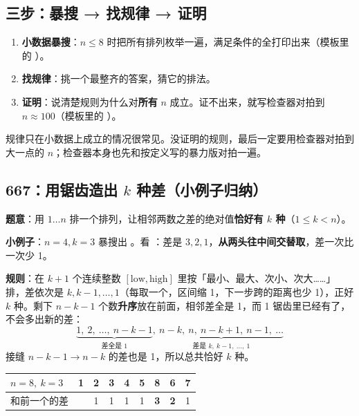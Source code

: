 \subsection{三步：暴搜 → 找规律 → 证明}

\begin{enumerate}
\item \textbf{小数据暴搜}：$n \le 8$ 时把所有排列枚举一遍，满足条件的全打印出来（模板里的 ）。
\item \textbf{找规律}：挑一个最整齐的答案，猜它的排法。
\item \textbf{证明}：说清楚规则为什么对\textbf{所有} $n$ 成立。证不出来，就写检查器对拍到 $n \approx 100$（模板里的 ）。
\end{enumerate}

\begin{principle}
规律只在小数据上成立的情况很常见。没证明的规则，最后一定要用检查器对拍到大一点的 $n$；检查器本身也先和按定义写的暴力版对拍一遍。
\end{principle}

\subsection{\texorpdfstring{667：用锯齿造出 $k$ 种差（小例子归纳）}{667：用锯齿造出 k 种差（小例子归纳）}}

\textbf{题意}：用 $1 \dots n$ 排一个排列，让相邻两数之差的绝对值\textbf{恰好有 $k$ 种}（$1 \le k < n$）。

\textbf{小例子}：$n = 4, k = 3$ 暴搜出 。看 ：差是 $3, 2, 1$，\textbf{从两头往中间交替取}，差一次比一次少 1。

\textbf{规则}：在 $k+1$ 个连续整数 $[\text{low}, \text{high}]$ 里按「最小、最大、次小、次大……」排，差依次是 $k, k-1, \dots, 1$（每取一个，区间缩 1，下一步跨的距离也少 1），正好 $k$ 种。剩下 $n-k-1$ 个数\textbf{升序}放在前面，相邻差全是 1，而 1 锯齿里已经有了，不会多出新的差：
\[
\underbrace{1,\ 2,\ \dots,\ n-k-1}_{\text{差全是 } 1},\ \underbrace{n-k,\ n,\ n-k+1,\ n-1,\ \dots}_{\text{差是 } k,\ k-1,\ \dots,\ 1}
\]
接缝 $n-k-1 \to n-k$ 的差也是 1，所以总共恰好 $k$ 种。

\begin{center}\small
\begin{tabular}{@{}l *{8}{c}@{}}
\toprule
$n=8,\ k=3$ & 1 & 2 & 3 & 4 & 5 & 8 & 6 & 7\\
\midrule
和前一个的差 & & 1 & 1 & 1 & 1 & \textbf{3} & \textbf{2} & 1\\
\bottomrule
\end{tabular}
\end{center}

